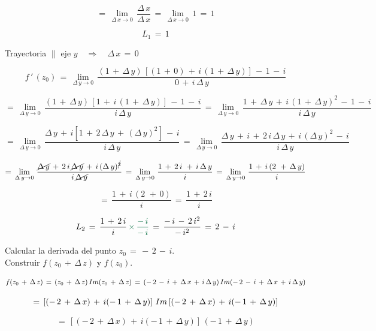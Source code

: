 \documentclass[a4paper,11pt,openany]{book}
\begin{document}
$$=\,\displaystyle\lim_{\Delta\,x \to 0}\,\dfrac{\Delta\,x}{\Delta\,x}\,=\,\displaystyle\lim_{\Delta\,x \to 0}\,1\,=\,1$$

$$L_{1}\,=\,1$$

\textcolor{ao(english)}{} Trayectoria $\parallel$ eje $y \quad\Rightarrow\quad \Delta\,x\,=\,0$

$$f\,'\,(z_{0})\,=\,\displaystyle\lim_{\Delta\,y \to 0}\,\dfrac{(1\,+\,\Delta\,y)\,\left[(1\,+\,0)\,+\,i\,(1\,+\,\Delta\,y)\right]\,-\,1\,-\,i}{0\,+\,i\,\Delta\,y}$$

$$=\,\displaystyle\lim_{\Delta\,y \to 0}\,\dfrac{(1\,+\,\Delta\,y)\,\left[1\,+\,i\,(1\,+\,\Delta\,y)\right]\,-\,1\,-\,i}{i\,\Delta\,y}\,=\,\displaystyle\lim_{\Delta\,y \to 0}\,\dfrac{1\,+\,\Delta\,y\,+\,i\,(1\,+\,\Delta\,y)^{2}\,-\,1\,-\,i}{i\,\Delta\,y}$$

$$=\,\displaystyle\lim_{\Delta\,y \to 0}\,\dfrac{\Delta\,y\,+\,i[1\,+\,2\,\Delta\,y\,+\,(\Delta\,y)^{2}]\,-\,i}{i\,\Delta\,y}\,=\,\displaystyle\lim_{\Delta\,y \to 0}\,\dfrac{\Delta\,y\,+\,i\,+\,2\,i\,\Delta\,y\,+\,i\,(\Delta\,y)^{2}\,-\,i}{i\,\Delta\,y}$$

$$=\,\displaystyle\lim_{\Delta\,y \to 0}\,\dfrac{\cancel{\Delta\,y}\,+\,2\,i\,\cancel{\Delta\,y}\,+\,i\,(\Delta\,y)^{\cancel{2}}}{i\,\cancel{\Delta\,y}}\,=\,\displaystyle\lim_{\Delta\,y \to 0}\,\dfrac{1\,+\,2\,i\,\,+\,i\,\Delta\,y}{i}\,=\,\displaystyle\lim_{\Delta\,y \to 0}\,\dfrac{1\,+\,i\,(2\,\,+\,\Delta\,y)}{i}$$

$$=\,\dfrac{1\,+\,i\,(2\,\,+\,0)}{i}\,=\,\dfrac{1\,+\,2\,i}{i}$$

$$L_{2}\,=\,\dfrac{1\,+\,2\,i}{i}\,\textcolor{cadmiumgreen}{\times\,\dfrac{-\,i}{-\,i}}\,=\,\dfrac{-\,i\,-\,2\,i^{2}}{-\,i^{2}}\,=\,2\,-\,i$$

\textcolor{ao(english)}{} Calcular la derivada del punto $z_{0}\,=\,-\,2\,-\,i$.\\

\textcolor{ao(english)}{} Construir $f(z_{0}\,+\,\Delta\,z)$ y $f(z_{0})$.

$$f(z_{0}\,+\,\Delta\,z)\,=\,(z_{0}\,+\,\Delta\,z)\,\mathnormal{Im}(z_{0}\,+\,\Delta\,z)\,=\,(-\,2\,-\,i\,+\,\Delta\,x\,+\,i\,\Delta\,y)\,\mathnormal{Im}(-\,2\,-\,i\,+\,\Delta\,x\,+\,i\,\Delta\,y)$$

$$=\,\left[(-\,2\,+\,\Delta\,x)\,+\,i(-\,1\,+\,\Delta\,y)\right]\,\mathnormal{Im}\left[(-\,2\,+\,\Delta\,x)\,+\,i(-\,1\,+\,\Delta\,y)\right]$$

$$=\,\left[(-\,2\,+\,\Delta\,x)\,+\,i(-\,1\,+\,\Delta\,y)\right]\,(-\,1\,+\,\Delta\,y)$$
\end{document}
